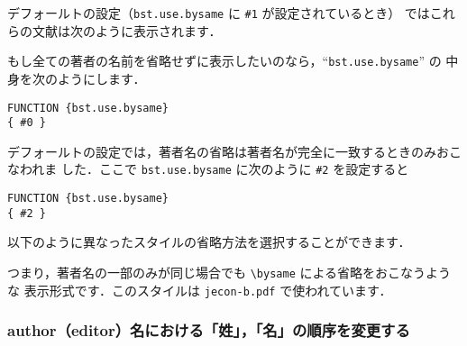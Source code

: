 \documentclass[article]{jlreq}
\newcommand{\bysameline}{\hskip.3em \leavevmode\rule[.5ex]{3em}{.3pt}\hskip0.5em}
\begin{document}
デフォールトの設定（\texttt{bst.use.bysame} に \texttt{\#1} が設定されているとき）
ではこれらの文献は次のように表示されます．
\begin{screen}
\end{screen}

もし全ての著者の名前を省略せずに表示したいのなら，``\texttt{bst.use.bysame}'' の
中身を次のようにします．
\begin{screen}
\begin{verbatim}
FUNCTION {bst.use.bysame}
{ #0 }  
\end{verbatim}
\end{screen}

デフォールトの設定では，著者名の省略は著者名が完全に一致するときのみおこなわれま
した．ここで \texttt{bst.use.bysame} に次のように \texttt{\#2} を設定すると
\begin{screen}
\begin{verbatim}
FUNCTION {bst.use.bysame}
{ #2 }  
\end{verbatim}
\end{screen}

以下のように異なったスタイルの省略方法を選択することができます．
\begin{screen}
\end{screen}
つまり，著者名の一部のみが同じ場合でも \verb|\bysame| による省略をおこなうような
表示形式です．このスタイルは \verb|jecon-b.pdf| で使われています．



\vspace*{1em}

\subsubsection{author（editor）名における「姓」，「名」の順序を変更する}
\end{document}
